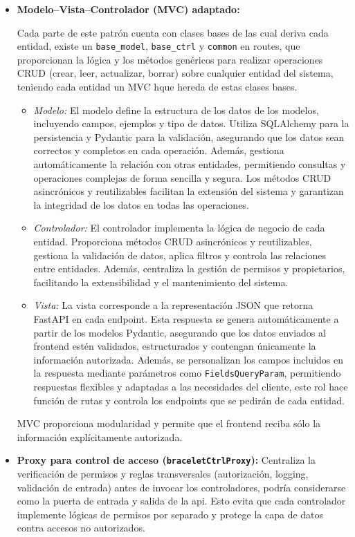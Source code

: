 \documentclass[12pt, a4paper]{article}
\begin{document}
\begin{itemize}
	\item \textbf{Modelo–Vista–Controlador (MVC) adaptado:}  
	
	Cada parte de este patrón cuenta con clases bases de las cual deriva cada entidad, existe un  \texttt{base\_model},  \texttt{base\_ctrl} y  \texttt{common} en routes, que proporcionan la lógica y los métodos genéricos para realizar operaciones CRUD (crear, leer, actualizar, borrar) sobre cualquier entidad del sistema, teniendo cada entidad un MVC hque hereda de estas clases bases.
	\begin{itemize}
		\item \emph{Modelo:} El modelo define la estructura de los datos de los modelos, incluyendo campos, ejemplos y tipo de datos. Utiliza SQLAlchemy para la persistencia y Pydantic para la validación, asegurando que los datos sean correctos y completos en cada operación.
		Además, gestiona automáticamente la relación con otras entidades, permitiendo consultas y operaciones complejas de forma sencilla y segura. Los métodos CRUD asincrónicos y reutilizables facilitan la extensión del sistema y garantizan la integridad de los datos en todas las operaciones.
		\item \emph{Controlador:} El controlador implementa la lógica de negocio de cada entidad. Proporciona métodos CRUD asincrónicos y reutilizables, gestiona la validación de datos, aplica filtros y controla las relaciones entre entidades. Además, centraliza la gestión de permisos y propietarios, facilitando la extensibilidad y el mantenimiento del sistema.
		\item \emph{Vista:} La vista corresponde a la representación JSON que retorna FastAPI en cada endpoint. Esta respuesta se genera automáticamente a partir de los modelos Pydantic, asegurando que los datos enviados al frontend estén validados, estructurados y contengan únicamente la información autorizada. Además, se personalizan los campos incluidos en la respuesta mediante parámetros como \texttt{FieldsQueryParam}, permitiendo respuestas flexibles y adaptadas a las necesidades del cliente, este rol hace función de rutas y controla los endpoints que se pedirán de cada entidad.
	\end{itemize}
	MVC proporciona modularidad y permite que el frontend reciba sólo la información explícitamente autorizada.
	\item \textbf{Proxy para control de acceso (\texttt{braceletCtrlProxy}):}  
	Centraliza la verificación de permisos y reglas transversales (autorización, logging, validación de entrada) antes de invocar los controladores, podría considerarse como la puerta de entrada y salida de la api. Esto evita que cada controlador implemente lógicas de permisos por separado y protege la capa de datos contra accesos no autorizados.

\end{itemize}
\end{document}
